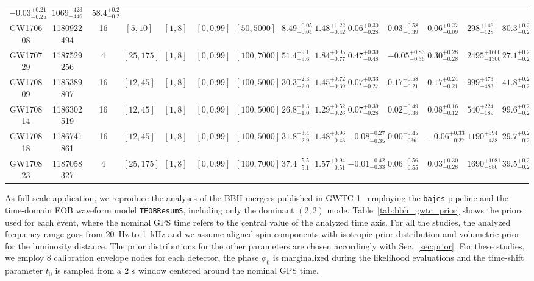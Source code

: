 \documentclass[prd,aps,twocolumn,a4paper,showkeys,nofootinbib,floatfix]{revtex4-1}
\newcommand{\bajes}{{\tt bajes}}
\begin{document}
\begin{table*}[t]
{\begin{tabular}{ccc|cccc|ccccccc}
			${-0.03}^{+0.21}_{-0.25}$&
			${1069}^{+423}_{-446}$&	
			$58.4^{+0.2}_{-0.2}$\\
			GW170608 &1180922494& 16&$[5,10]$&$[1,8]$&$[0,0.99]$&$[50,5000]$&
			${8.49}^{+{0.05}}_{-{0.04}}$&
			${1.48}^{+{1.22}}_{-{0.42}}$&
			${0.06}^{+{0.30}}_{-{0.28}}$&
			${0.03}^{+{0.58}}_{-{0.39}}$&
			${0.06}^{+{0.27}}_{-{0.09}}$&
			${298}^{+{146}}_{-{128}}$&
			$80.3^{+0.2}_{-0.2}$\\
			GW170729 &1187529256& 4&$[25,175]$&$[1,8]$&$[0,0.99]$&$[100,7000]$&
			${51.4}^{+9.1}_{-9.6}$&
			${1.84}^{+{0.95}}_{-{0.77}}$&
			${0.47}^{+{0.39}}_{-{0.48}}$&
			${-0.05}^{+{0.83}}_{-{0.36}}$&
			${0.30}^{+{0.28}}_{-{0.28}}$&
			${2495}^{+{1600}}_{-{1300}}$&
			$27.1^{+0.2}_{-0.2}$\\
			GW170809 &1185389807& 16&$[12,45]$&$[1,8]$&$[0,0.99]$&$[100,5000]$&
			${30.3}^{+{2.3}}_{-{2.0}}$&
			${1.45}^{+{0.72}}_{-{0.39}}$&
			${0.07}^{+{0.33}}_{-{0.27}}$&
			${0.17}^{+{0.58}}_{-{0.21}}$&
			${0.17}^{+{0.24}}_{-{0.21}}$&
			${999}^{+{473}}_{-{483}}$&
			$41.8^{+0.2}_{-0.2}$\\
			GW170814 &1186302519& 16&$[12,45]$&$[1,8]$&$[0,0.99]$&$[100,5000]$&
			${26.8}^{+{1.3}}_{-{1.0}}$&
			${1.29}^{+{0.52}}_{-{0.26}}$&
			${0.07}^{+{0.39}}_{-{0.28}}$&
			${0.02}^{+{0.49}}_{-{0.38}}$&
			${0.08}^{+{0.16}}_{-{0.12}}$&
			${540}^{+{224}}_{-{189}}$&
			$99.6^{+0.2}_{-0.2}$\\
			GW170818 &1186741861& 16&$[12,45]$&$[1,8]$&$[0,0.99]$&$[100,5000]$&
			${31.8}^{+{3.4}}_{-{2.9}}$&
			${1.48}^{+{0.96}}_{-{0.43}}$&
			${-0.08}^{+{0.27}}_{-{0.35}}$&
			${0.00}^{+{0.45}}_{-{036}}$&
			${-0.06}^{+{0.33}}_{-{0.27}}$&
			${1190}^{+{594}}_{-{438}}$&
			$29.7^{+0.2}_{-0.2}$\\
			GW170823 &1187058327& 4&$[25,175]$&$[1,8]$&$[0,0.99]$&$[100,7000]$&
			${37.4}^{+{ 5.5}}_{-{5.1}}$&
			${1.57}^{+{0.94}}_{-{0.51}}$&
			${-0.01}^{+{0.42}}_{-{0.33}}$&
			${0.06}^{+{0.56}}_{-{0.55}}$&
			${0.03}^{+{0.30}}_{-{0.28}}$&
			${1690}^{+{1081}}_{-{880}}$&
			$39.5^{+0.2}_{-0.2}$\\
			\hline
			\hline
		\end{tabular}
	}
	\label{tab:bbh_gwtc_prior}
\end{table*}

As full scale application,
we reproduce the analyses of the BBH mergers 
published in GWTC-1~\cite{LIGOScientific:2018mvr}
employing  the {\bajes} pipeline and
the time-domain EOB waveform model {\tt TEOBResumS}, including only
the dominant $(2,2)$ mode.
Table~\ref{tab:bbh_gwtc_prior} shows the priors used for each event, where
the nominal GPS time refers to the
central value of the analyzed time axis.
For all the studies, the analyzed frequency range goes from 20~Hz 
to 1~kHz and
we assume aligned spin components 
with isotropic prior distribution and volumetric prior for the luminosity 
distance. The prior distributions for the other parameters are chosen
accordingly with Sec.~\ref{sec:prior}.
For these studies, we employ 8 calibration envelope nodes 
for each detector, the phase $\phi_0$ is marginalized during the
likelihood evaluations and the time-shift parameter $t_0$ is sampled 
from a $2~{\rm s}$ window centered around the nominal GPS time.
\end{document}
